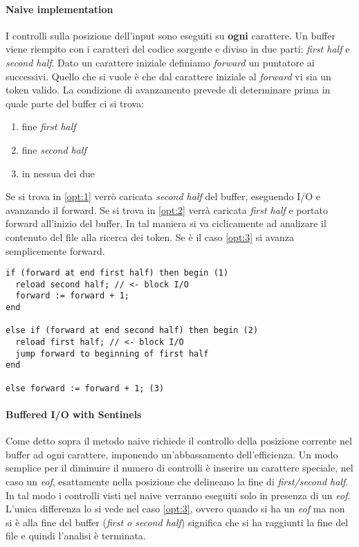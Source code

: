 \paragraph{Naive implementation}
\label{par:naive_implementation}
I controlli sulla posizione dell'input sono eseguiti su \textbf{ogni} carattere.
Un buffer viene riempito con i caratteri del codice sorgente e diviso in due
parti: \textit{first half} e \textit{second half}. Dato un carattere iniziale
definiamo \textit{forward} un puntatore ai successivi. Quello che si vuole è
che dal carattere iniziale al \textit{forward} vi sia un token valido. La
condizione di avanzamento prevede di determinare prima in quale parte del buffer
ci si trova:
\begin{enumerate}
\item fine \textit{first half} \label{opt:1}
\item fine \textit{second half} \label{opt:2}
\item in nessua dei due \label{opt:3}
\end{enumerate}
Se si trova in \ref{opt:1} verrò caricata \textit{second half} del buffer,
eseguendo I/O e avanzando il forward. Se si trova in \ref{opt:2} verrà
caricata \textit{first half} e portato forward all'inizio del buffer. In tal
maniera si va ciclicamente ad analizare il contenuto del file alla ricerca dei
token. Se è il caso \ref{opt:3} si avanza semplicemente forward.

\begin{lstlisting}[caption=Pseudo-codice implementazione naive]
if (forward at end first half) then begin (1)
  reload second half; // <- block I/O
  forward := forward + 1;
end

else if (forward at end second half) then begin (2)
  reload first half; // <- block I/O
  jump forward to beginning of first half
end

else forward := forward + 1; (3)
\end{lstlisting}

\paragraph{Buffered I/O with Sentinels}
Come detto sopra il metodo naive richiede il controllo della posizione corrente
nel buffer ad ogni carattere, imponendo un'abbassamento dell'efficienza. Un modo
semplice per il diminuire il numero di controlli è inserire un carattere
speciale, nel caso un \textit{eof}, esattamente nella posizione che delineano la
fine di \textit{first/second half}. In tal modo i controlli visti nel naive
verranno eseguiti solo in presenza di un \textit{eof}. L'unica differenza lo si
vede nel caso \ref{opt:3}, ovvero quando si ha un \textit{eof} ma non si è alla
fine del buffer (\textit{first o second half}) significa che si ha raggiunti la
fine del file e quindi l'analisi è terminata.


